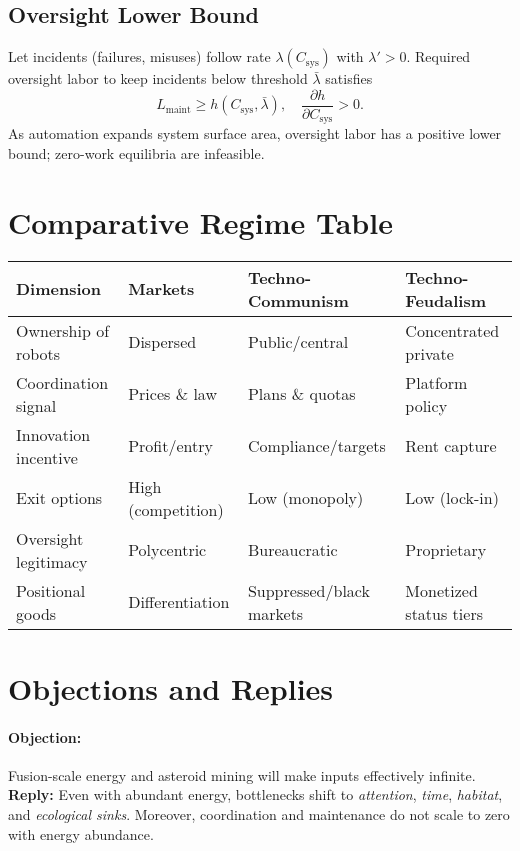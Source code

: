 \documentclass[12pt]{article}
\begin{document}
\subsection{Oversight Lower Bound}
Let incidents (failures, misuses) follow rate $\lambda(C_{\text{sys}})$ with $\lambda' > 0$. Required oversight labor to keep incidents below threshold $\bar{\lambda}$ satisfies
\[
L_{\text{maint}} \geq h(C_{\text{sys}}, \bar{\lambda}), \quad \frac{\partial h}{\partial C_{\text{sys}}} > 0.
\]
As automation expands system surface area, oversight labor has a positive lower bound; zero-work equilibria are infeasible.

\section{Comparative Regime Table}
\begin{center}
\begin{tabular}{@{}llll@{}}
\toprule
\textbf{Dimension} & \textbf{Markets} & \textbf{Techno-Communism} & \textbf{Techno-Feudalism} \\
\midrule
Ownership of robots & Dispersed & Public/central & Concentrated private \\
Coordination signal & Prices \& law & Plans \& quotas & Platform policy \\
Innovation incentive & Profit/entry & Compliance/targets & Rent capture \\
Exit options & High (competition) & Low (monopoly) & Low (lock-in) \\
Oversight legitimacy & Polycentric & Bureaucratic & Proprietary \\
Positional goods & Differentiation & Suppressed/black markets & Monetized status tiers \\
\bottomrule
\end{tabular}
\end{center}

\section{Objections and Replies}
\paragraph{Objection:} Fusion-scale energy and asteroid mining will make inputs effectively infinite.\\
\textbf{Reply:} Even with abundant energy, bottlenecks shift to \emph{attention}, \emph{time}, \emph{habitat}, and \emph{ecological sinks}. Moreover, coordination and maintenance do not scale to zero with energy abundance.
\end{document}
